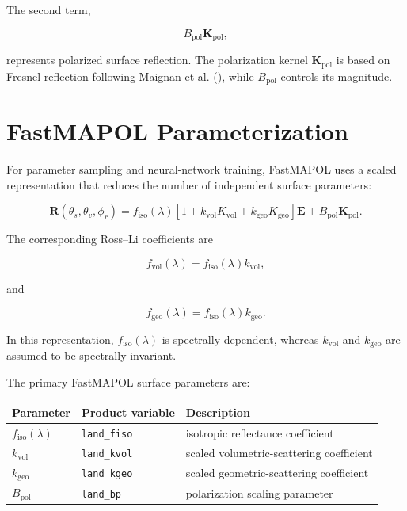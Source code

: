 \documentclass[
  11pt,
  letterpaper,
]{scrreprt}
\begin{document}
The second term,

\[
B_{\mathrm{pol}}\mathbf{K}_{\mathrm{pol}},
\]

represents polarized surface reflection. The polarization kernel
\(\mathbf{K}_{\mathrm{pol}}\) is based on Fresnel reflection following
Maignan et al. (), while
\(B_{\mathrm{pol}}\) controls its magnitude.

\section{FastMAPOL Parameterization}\label{fastmapol-parameterization}

For parameter sampling and neural-network training, FastMAPOL uses a
scaled representation that reduces the number of independent surface
parameters:

\[
\mathbf{R}(\theta_s,\theta_v,\phi_r)
=
f_{\mathrm{iso}}(\lambda)
\left[
1
+
k_{\mathrm{vol}}K_{\mathrm{vol}}
+
k_{\mathrm{geo}}K_{\mathrm{geo}}
\right]\mathbf{E}
+
B_{\mathrm{pol}}\mathbf{K}_{\mathrm{pol}}.
\]

The corresponding Ross--Li coefficients are

\[
f_{\mathrm{vol}}(\lambda)
=
f_{\mathrm{iso}}(\lambda)k_{\mathrm{vol}},
\]

and

\[
f_{\mathrm{geo}}(\lambda)
=
f_{\mathrm{iso}}(\lambda)k_{\mathrm{geo}}.
\]

In this representation, \(f_{\mathrm{iso}}(\lambda)\) is spectrally
dependent, whereas \(k_{\mathrm{vol}}\) and \(k_{\mathrm{geo}}\) are
assumed to be spectrally invariant.

The primary FastMAPOL surface parameters are:

\begin{longtable}[]{@{}
  >{\raggedright\arraybackslash}p{}
  >{\raggedright\arraybackslash}p{}
  >{\raggedright\arraybackslash}p{}@{}}
\toprule\noalign{}
\begin{minipage}[b]{\linewidth}\raggedright
Parameter
\end{minipage} & \begin{minipage}[b]{\linewidth}\raggedright
Product variable
\end{minipage} & \begin{minipage}[b]{\linewidth}\raggedright
Description
\end{minipage} \\
\midrule\noalign{}
\endhead
\bottomrule\noalign{}
\endlastfoot
\(f_{\mathrm{iso}}(\lambda)\) & \texttt{land\_fiso} & isotropic
reflectance coefficient \\
\(k_{\mathrm{vol}}\) & \texttt{land\_kvol} & scaled
volumetric-scattering coefficient \\
\(k_{\mathrm{geo}}\) & \texttt{land\_kgeo} & scaled geometric-scattering
coefficient \\
\(B_{\mathrm{pol}}\) & \texttt{land\_bp} & polarization scaling
parameter \\
\end{longtable}
\end{document}
